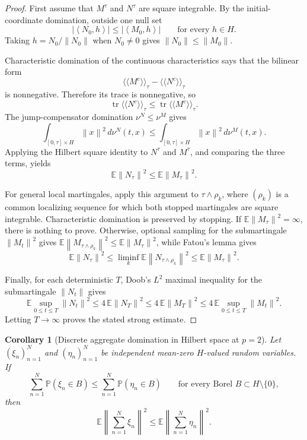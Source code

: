 \documentclass[11pt]{article}
\newtheorem{corollary}{Corollary}
\newcommand{\E}{\mathbb E}
\newcommand{\norm}[1]{\left\lVert #1\right\rVert}
\newcommand{\ip}[2]{\left\langle #1,#2\right\rangle}
\begin{document}
\begin{proof}
First assume that \(M^\tau\) and \(N^\tau\) are square integrable.  By the
initial-coordinate domination, outside one null set
\[
   |\ip{N_0}{h}|\leq |\ip{M_0}{h}|
   \qquad\text{for every }h\in H.
\]
Taking \(h=N_0/\norm{N_0}\) when \(N_0\neq0\) gives
\(\norm{N_0}\leq\norm{M_0}\).

Characteristic domination of the continuous characteristics says that the
bilinear form
\[
  \langle\!\langle M^c\rangle\!\rangle_\tau
  -
  \langle\!\langle N^c\rangle\!\rangle_\tau
\]
is nonnegative.  Therefore its trace is nonnegative, so
\[
 \operatorname{tr}\langle\!\langle N^c\rangle\!\rangle_\tau
 \leq
 \operatorname{tr}\langle\!\langle M^c\rangle\!\rangle_\tau .
\]
The jump-compensator domination \(\nu^N\leq \nu^M\) gives
\[
  \int_{[0,\tau]\times H}\norm{x}^2\,d\nu^N(t,x)
  \leq
  \int_{[0,\tau]\times H}\norm{x}^2\,d\nu^M(t,x).
\]
Applying the Hilbert square identity to \(N^\tau\) and \(M^\tau\), and
comparing the three terms, yields
\[
   \E\norm{N_\tau}^2 \leq \E\norm{M_\tau}^2.
\]

For general local martingales, apply this argument to
\(\tau\wedge\rho_k\), where \((\rho_k)\) is a common localizing sequence for
which both stopped martingales are square integrable.  Characteristic
domination is preserved by stopping.  If \(\E\norm{M_\tau}^2=\infty\), there is
nothing to prove.  Otherwise, optional sampling for the submartingale
\(\norm{M_t}^2\) gives
\(\E\norm{M_{\tau\wedge\rho_k}}^2\leq \E\norm{M_\tau}^2\), while Fatou's lemma
gives
\[
   \E\norm{N_\tau}^2
   \leq
   \liminf_k \E\norm{N_{\tau\wedge\rho_k}}^2
   \leq
   \E\norm{M_\tau}^2 .
\]

Finally, for each deterministic \(T\), Doob's \(L^2\) maximal inequality for
the submartingale \(\norm{N_t}\) gives
\[
  \E\sup_{0\leq t\leq T}\norm{N_t}^2
  \leq
  4\,\E\norm{N_T}^2
  \leq
  4\,\E\norm{M_T}^2
  \leq
  4\,\E\sup_{0\leq t\leq T}\norm{M_t}^2.
\]
Letting \(T\to\infty\) proves the stated strong estimate.
\end{proof}

\begin{corollary}[Discrete aggregate domination in Hilbert space at \(p=2\)]
Let \((\xi_n)_{n=1}^N\) and \((\eta_n)_{n=1}^N\) be independent mean-zero
\(H\)-valued random variables.  If
\[
  \sum_{n=1}^N \mathbb P(\xi_n\in B)
  \leq
  \sum_{n=1}^N \mathbb P(\eta_n\in B)
  \qquad
  \text{for every Borel }B\subset H\setminus\{0\},
\]
then
\[
  \E\norm{\sum_{n=1}^N \xi_n}^2
  \leq
  \E\norm{\sum_{n=1}^N \eta_n}^2.
\]
\end{corollary}
\end{document}
